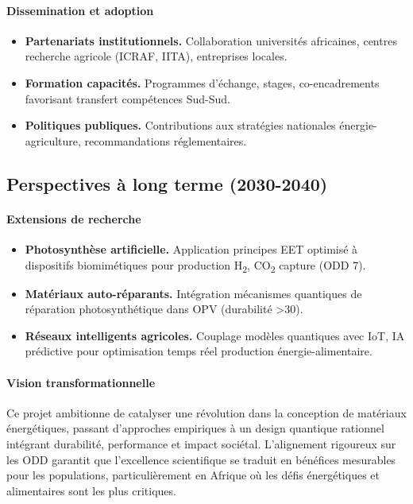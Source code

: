 \documentclass[12pt, a4paper]{article}
\begin{document}
\paragraph{Dissemination et adoption}
\begin{itemize}
    \item \textbf{Partenariats institutionnels.} Collaboration universités africaines, centres recherche agricole (ICRAF, IITA), entreprises locales.
    \item \textbf{Formation capacités.} Programmes d'échange, stages, co-encadrements favorisant transfert compétences Sud-Sud.
    \item \textbf{Politiques publiques.} Contributions aux stratégies nationales énergie-agriculture, recommandations réglementaires.
\end{itemize}

\subsection{Perspectives à long terme (2030-2040)}

\paragraph{Extensions de recherche}
\begin{itemize}
    \item \textbf{Photosynthèse artificielle.} Application principes EET optimisé à dispositifs biomimétiques pour production H\textsubscript{2}, CO\textsubscript{2} capture (ODD 7).
    \item \textbf{Matériaux auto-réparants.} Intégration mécanismes quantiques de réparation photosynthétique dans OPV (durabilité \SI{>30}{\year}).
    \item \textbf{Réseaux intelligents agricoles.} Couplage modèles quantiques avec IoT, IA prédictive pour optimisation temps réel production énergie-alimentaire.
\end{itemize}

\paragraph{Vision transformationnelle}
Ce projet ambitionne de catalyser une révolution dans la conception de matériaux énergétiques, passant d'approches empiriques à un design quantique rationnel intégrant durabilité, performance et impact sociétal. L'alignement rigoureux sur les ODD garantit que l'excellence scientifique se traduit en bénéfices mesurables pour les populations, particulièrement en Afrique où les défis énergétiques et alimentaires sont les plus critiques.
\end{document}

